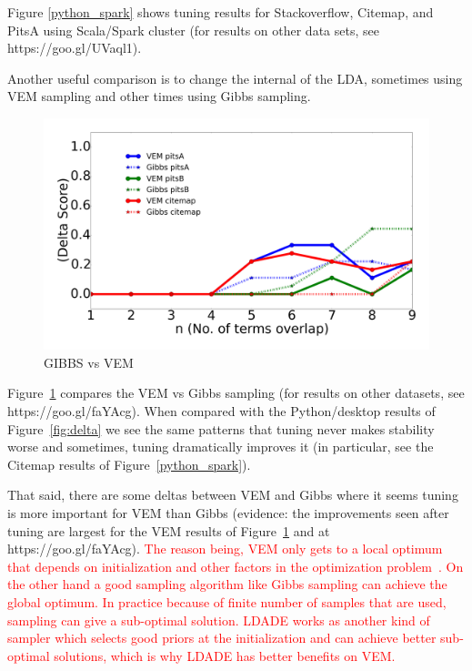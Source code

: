 \documentclass[twocolumn,5p,sort&compress]{elsarticle}
\theoremstyle{break}
\begin{document}
Figure \ref{python_spark} shows tuning results for Stackoverflow, Citemap, and PitsA 
   using Scala/Spark cluster (for results on other data sets, see https://goo.gl/UVaql1).
   
  Another useful comparison is to change the internal of the LDA, sometimes using VEM sampling and other times using Gibbs sampling.


\begin{figure}[!htbp]
  \captionsetup{justification=centering}
  \includegraphics[width=\linewidth]{./fig/gibbs_vem1.png}
  \caption{GIBBS vs VEM}
  \label{gibbs_vem}
\end{figure}


  Figure~\ref{gibbs_vem} compares the  VEM vs Gibbs sampling (for results on other datasets, see https://goo.gl/faYAcg). When compared with the Python/desktop results of
   Figure~\ref{fig:delta} we see the same patterns that tuning never makes stability worse and sometimes, tuning dramatically improves it (in particular, see the Citemap results
   of  Figure~\ref{python_spark}).

   That said, there are some deltas between VEM and Gibbs where it seems tuning
   is more important for VEM than Gibbs (evidence: the improvements seen after
   tuning are largest for the  VEM results of  Figure~\ref{gibbs_vem} and at  https://goo.gl/faYAcg). \textcolor{red}{The reason being, VEM only gets to a local optimum that depends on initialization and other factors in the optimization problem~\cite{asuncion2009smoothing}. On the other hand a good sampling algorithm like Gibbs sampling can achieve the global optimum. In practice because of finite number of samples that are used, sampling can give a sub-optimal solution. LDADE works as another kind of sampler which selects good priors at the initialization and can achieve better sub-optimal solutions, which is why LDADE has better benefits on VEM.}
\end{document}
